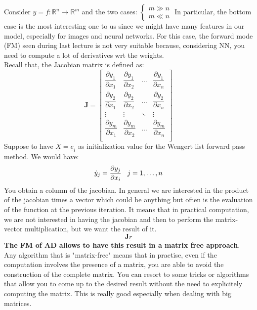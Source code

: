 Consider $y = f: \mathbb{R}^n \to \mathbb{R}^m$ and the two cases: $\begin{cases}
    m \gg n\\
    m \ll n
\end{cases}$
In particular, the bottom case is the most interesting one to us since we might have many features in our model, especially for images and neural networks. For this case, the forward mode (FM) seen during last lecture is not very suitable because, considering NN, you need to compute a lot of derivatives wrt the weights. \\

Recall that, the Jacobian matrix is defined as:
\[
    \mathbf{J} = \begin{bmatrix}
        \dfrac{\partial y_1}{\partial x_1} & \dfrac{\partial y_1}{\partial x_2} & \dots & \dfrac{\partial y_1}{\partial x_n}\\
        \dfrac{\partial y_2}{\partial x_1} & \dfrac{\partial y_2}{\partial x_2} & \dots & \dfrac{\partial y_2}{\partial x_n}\\
        \vdots & \vdots & \ddots & \vdots\\
        \dfrac{\partial y_m}{\partial x_1} & \dfrac{\partial y_m}{\partial x_2} & \dots & \dfrac{\partial y_m}{\partial x_n}\\
    \end{bmatrix}    
\]
Suppose to have $\dot{\underline{X}} = \underline{e}_i$ as initialization value for the Wengert list forward pass method. We would have:
\[
    \dot{y}_j = \dfrac{\partial y_j}{\partial x_i} \hspace{0.3cm} j = 1, \dots, n    
\]
You obtain a column of the jacobian. In general we are interested in the product of the jacobian times a vector which could be anything but often is the evaluation of the function at the previous iteration. It means that in practical computation, we are not interested in having the jacobian and then to perform the matrix-vector multiplication, but we want the result of it. 
\[\mathbf{J}\underline{r}\]
\textbf{The FM of AD allows to have this result in a matrix free approach}. Any algorithm that is "matrix-free" means that in practise, even if the computation involves the presence of a matrix, you are able to avoid the construction of the complete matrix. You can resort to some tricks or algorithms that allow you to come up to the desired result without the need to explicitely computing the matrix. This is really good especially when dealing with big matrices. 

